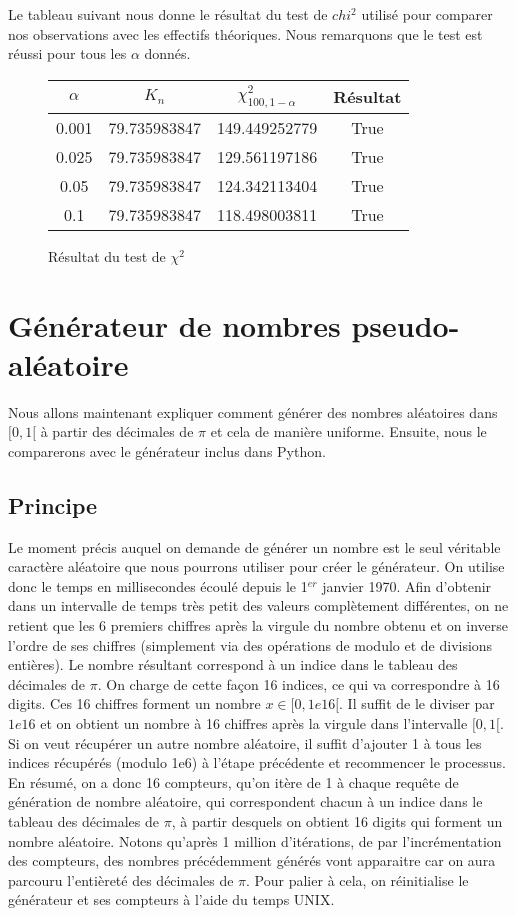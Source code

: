 \documentclass[10pt,a4paper]{article}
\begin{document}
Le tableau suivant nous donne le résultat du test de $chi^2$ utilisé pour comparer nos observations avec les effectifs théoriques. Nous remarquons que le test est réussi pour tous les $\alpha$ donnés.
\begin{figure}[H]
\begin{center}
\begin{tabular}{|c|c|c|c|}
\hline
$\alpha$ & $K_{n}$ & $\chi^2_{100, 1 - \alpha}$ & Résultat\\
\hline
0.001 & 79.735983847 & 149.449252779 & True\\
0.025 & 79.735983847 & 129.561197186 & True\\
0.05 & 79.735983847 & 124.342113404 & True\\
0.1 & 79.735983847 & 118.498003811 & True\\
\hline
\end{tabular}
\end{center}
\caption{Résultat du test de $\chi^2$}
\end{figure} 

\section{Générateur de nombres pseudo-aléatoire}
Nous allons maintenant expliquer comment générer des nombres aléatoires dans $[0, 1[$ à partir des décimales de $\pi$ et cela de manière uniforme. Ensuite, nous le comparerons avec le générateur inclus dans Python.
\subsection{Principe}
Le moment précis auquel on demande de générer un nombre est le seul véritable caractère aléatoire que nous pourrons utiliser pour créer le générateur. On utilise donc le temps en millisecondes écoulé depuis le 1$^{er}$ janvier 1970. Afin d'obtenir dans un intervalle de temps très petit des valeurs complètement différentes, on ne retient que les 6 premiers chiffres après la virgule du nombre obtenu et on inverse l'ordre de ses chiffres (simplement via des opérations de modulo et de divisions entières). Le nombre résultant correspond à un indice dans le tableau des décimales de $\pi$. On charge de cette façon 16 indices, ce qui va correspondre à 16 digits. Ces 16 chiffres forment un nombre $x \in [0, 1e16[$. Il suffit de le diviser par $1e16$ et on obtient un nombre à 16 chiffres après la virgule dans l'intervalle $[0, 1[$. Si on veut récupérer un autre nombre aléatoire, il suffit d'ajouter 1 à tous les indices récupérés (modulo 1e6) à l'étape précédente et recommencer le processus. En résumé, on a donc 16 compteurs, qu'on itère de 1 à chaque requête de génération de nombre aléatoire, qui correspondent chacun à un indice dans le tableau des décimales de $\pi$, à partir desquels on obtient 16 digits qui forment un nombre aléatoire. Notons qu'après 1 million d'itérations, de par l'incrémentation des compteurs, des nombres précédemment générés vont apparaitre car on aura parcouru l'entièreté des décimales de $\pi$. Pour palier à cela, on réinitialise le générateur et ses compteurs à l'aide du temps UNIX.
\end{document}
